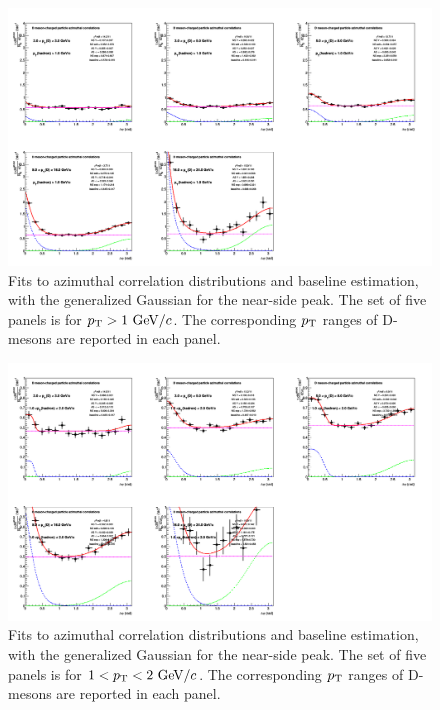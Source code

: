 \begin{figure}[h]
\centering
\includegraphics[width=0.99\linewidth, height=0.70\linewidth,angle=270]{figures/Fits/cFitting_0_pthad1dot0to99dot_Alt.png}
\caption{Fits to azimuthal correlation distributions and baseline estimation, with the generalized Gaussian for the near-side peak. The set of five panels is for $p_{\rm T}>1~\mathrm{GeV}/c$. The corresponding $p_{\rm T}$ ranges of D-mesons are reported in each panel.}
\label{fig:AltFit3}
\end{figure}
\begin{figure}[h]
\centering
\includegraphics[width=0.99\linewidth, height=0.70\linewidth,angle=270]{figures/Fits/cFitting_0_pthad1dot0to2dot0_Alt.png}
\caption{Fits to azimuthal correlation distributions and baseline estimation, with the generalized Gaussian for the near-side peak. The set of five panels is for $1<p_{\rm T}<2~\mathrm{GeV}/c$. The corresponding $p_{\rm T}$ ranges of D-mesons are reported in each panel.}
\label{fig:AltFit4}
\end{figure}
